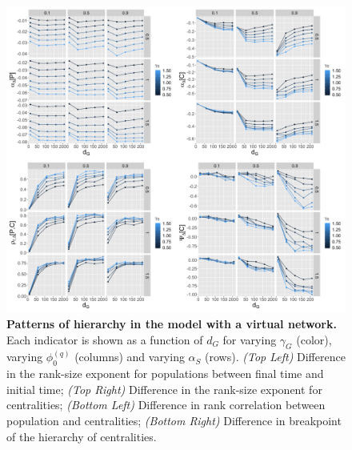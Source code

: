 \documentclass[11pt]{article}
\begin{document}
\begin{figure}
\includegraphics[width=\linewidth]{Fig2.png}
\caption{\textbf{Patterns of hierarchy in the model with a virtual network.} Each indicator is shown as a function of $d_G$ for varying $\gamma_G$ (color), varying $\phi_0^{(q)}$ (columns) and varying $\alpha_S$ (rows). \textit{(Top Left)} Difference in the rank-size exponent for populations between final time and initial time; \textit{(Top Right)} Difference in the rank-size exponent for centralities; \textit{(Bottom Left)} Difference in rank correlation between population and centralities; \textit{(Bottom Right)} Difference in breakpoint of the hierarchy of centralities. \label{fig:gridexplo-virtual}}
\end{figure}
\end{document}
